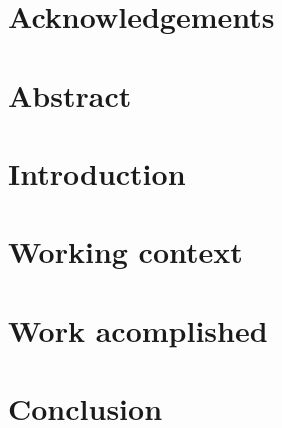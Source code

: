 \section{Acknowledgements}


\section{Abstract}


\section{Introduction}


\section{Working context}



\section{Work acomplished}




% 

\section{Conclusion}

